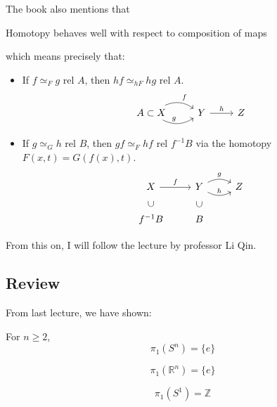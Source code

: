 The book also mentions that
\begin{lemma}
    Homotopy behaves well with respect to composition of maps
\end{lemma}
which means precisely that:
\begin{itemize}
    \item If $f\simeq_F g$ rel $A$, then $hf\simeq_{hF} hg$ rel $A$.
        $$ \begin{tikzcd}[]
            A\subset X \ar[r,"f",bend left]\ar[r,"g",bend right]
                & Y \ar[r,"h"] & Z
        \end{tikzcd}$$
    \item If $g\simeq_G h$ rel $B$, then $gf\simeq_F hf$ rel $f^{-1}B$
        via the homotopy $F(x,t)=G(f(x),t)$.
        $$ \begin{tikzcd}[]
            X\ar[r,"f"] & Y \ar[r,"g",bend left]\ar[r,"h",bend right]
             & Z \\
            f^{-1}B\ar[u,phantom,"\subset"
            {anchor=south,rotate=90,left=0,near end}]
                &
            B\ar[u,phantom,"\subset" {anchor=south,rotate=90,left=0,near
            end}] & \, 
        \end{tikzcd}$$
\end{itemize}




From this on, I will follow the lecture by professor Li Qin.

\subsection{Review}
\label{sec:Review}
From last lecture, we have shown:
\begin{ex}
    For $n\geq 2$,
    $$ \pi_1 (S^n) = \{e\} $$
\end{ex}
\begin{ex}
    $$ \pi_1 (\mathbb{R}^n) = \{e\}$$
\end{ex}

\begin{thm}
    $$\pi_1 (S^1) = \mathbb{Z} $$
\end{thm}

